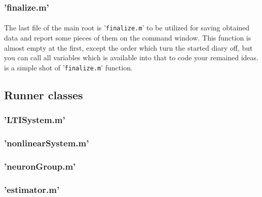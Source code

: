 {{		\subsubsection{'finalize.m'} {
			\paragraph{} {
				The last file of the main root is '\texttt{finalize.m}' to be utilized for saving obtained data and report some pieces of them on the command window.
				This function is almost empty at the first, except the order which turn the started diary off, but you can call all variables which is available into that to code your remained ideas.  is a simple shot of '\texttt{finalize.m}' function.
			}
			\begin{figure}[tbp]
			\end{figure}
		}
	}
	
	\subsection{Runner classes} {
		\subsubsection{'LTISystem.m'} {
			
		}
		\subsubsection{'nonlinearSystem.m'} {
			
		}
		\subsubsection{'neuronGroup.m'} {
			
		}
		\subsubsection{'estimator.m'} {
			
}}}
